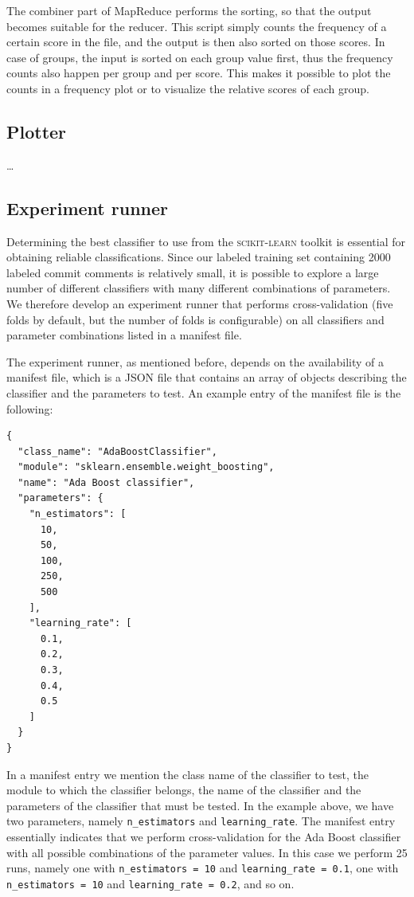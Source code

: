 \documentclass{article}
\begin{document}
The combiner part of MapReduce performs the sorting, so that the output becomes 
suitable for the reducer. This script simply counts the frequency of a certain 
score in the file, and the output is then also sorted on those scores. In case 
of groups, the input is sorted on each group value first, thus the frequency
counts also happen per group and per score. This makes it possible to plot the
counts in a frequency plot or to visualize the relative scores of each group.

\subsection{Plotter}\label{sec:plotter}
\ldots

\subsection{Experiment runner}\label{sec:experiment-runner}
Determining the best classifier to use from the \textsc{scikit-learn} toolkit is
essential for obtaining reliable classifications. Since our labeled training
set containing 2000 labeled commit comments is relatively small, it is possible
to explore a large number of different classifiers with many different
combinations of parameters. We therefore develop an experiment runner that
performs cross-validation (five folds by default, but the number of folds is
configurable) on all classifiers and parameter combinations listed in a
manifest file.

The experiment runner, as mentioned before, depends on the availability of
a manifest file, which is a JSON file that contains an array of objects
describing the classifier and the parameters to test. An example entry
of the manifest file is the following:

\begin{verbatim}
{
  "class_name": "AdaBoostClassifier",
  "module": "sklearn.ensemble.weight_boosting",
  "name": "Ada Boost classifier",
  "parameters": {
    "n_estimators": [
      10,
      50,
      100,
      250,
      500
    ],
    "learning_rate": [
      0.1,
      0.2,
      0.3,
      0.4,
      0.5
    ]
  }
}
\end{verbatim}

In a manifest entry we mention the class name of the classifier to test, the
module to which the classifier belongs, the name of the classifier and the
parameters of the classifier that must be tested. In the example above, we have 
two parameters, namely {\tt n\_estimators} and
{\tt learning\_rate}. The manifest entry essentially indicates that we perform
cross-validation for the Ada Boost classifier with all possible combinations
of the parameter values. In this case we perform 25 runs, namely one with
{\tt n\_estimators = 10} and {\tt learning\_rate = 0.1}, one with
{\tt n\_estimators = 10} and {\tt learning\_rate = 0.2}, and so on.
\end{document}
